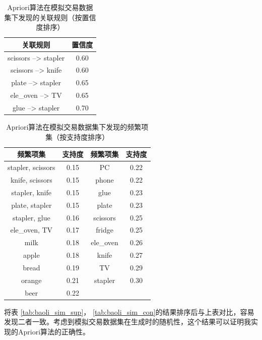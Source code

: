 \documentclass[12pt,a4paper]{article}
\theoremstyle{definition}
\begin{document}
\begin{table}[H]
	\renewcommand\arraystretch{1.35}
	\caption{Apriori算法在模拟交易数据集下发现的关联规则（按置信度排序）}
	\label{tab:apriori_sim_con}
	\centering
	
	\begin{tabular}{c|c}
		\centering
		关联规则 & 置信度 \\
		\hline
		scissors --> stapler & 0.60 \\
		scissors --> knife & 0.60 \\
		plate --> stapler & 0.65 \\
		ele\_oven --> TV & 0.65 \\
		glue --> stapler & 0.70 \\
	\end{tabular}
\end{table}

\vspace{-0.03\linewidth}
\begin{table}[H]
	\renewcommand\arraystretch{1.35}
	\caption{Apriori算法在模拟交易数据集下发现的频繁项集（按支持度排序）}
	\label{tab:apriori_sim_sup}
	\centering
	
	\begin{tabular}{c|c|c|c}
		\centering
		频繁项集 & 支持度 & 频繁项集 & 支持度 \\
		\hline
		stapler, scissors & 0.15 & PC & 0.22 \\
		knife, scissors & 0.15 & phone & 0.22 \\
		stapler, knife & 0.15 & glue & 0.23 \\
		plate, stapler & 0.15 &plate & 0.23 \\
		stapler, glue & 0.16 & scissors & 0.25 \\
		ele\_oven, TV & 0.17 & fridge & 0.25 \\
		milk & 0.18 & ele\_oven & 0.26 \\
		apple & 0.18 & knife & 0.27 \\
		bread & 0.19 & TV & 0.29 \\
		orange & 0.21 & stapler & 0.30 \\
		beer & 0.22 & & \\		
	\end{tabular}
\end{table}

\vspace{-0.02\linewidth}
将表 \ref{tab:baoli_sim_sup}， \ref{tab:baoli_sim_con}的结果排序后与上表对比，容易发现二者一致。考虑到模拟交易数据集在生成时的随机性，这个结果可以证明我实现的Apriori算法的正确性。
\end{document}
